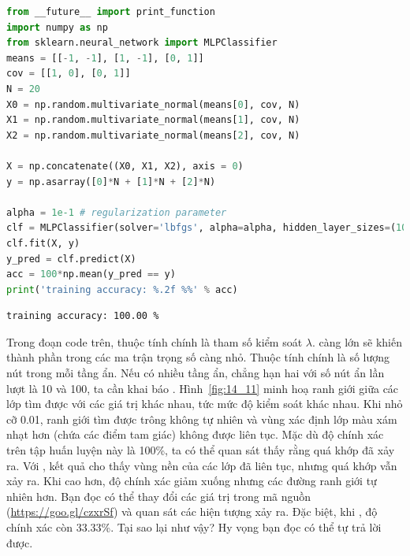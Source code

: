 \begin{lstlisting}[language=Python]
from __future__ import print_function 
import numpy as np 
from sklearn.neural_network import MLPClassifier
means = [[-1, -1], [1, -1], [0, 1]]
cov = [[1, 0], [0, 1]]
N = 20
X0 = np.random.multivariate_normal(means[0], cov, N)
X1 = np.random.multivariate_normal(means[1], cov, N)
X2 = np.random.multivariate_normal(means[2], cov, N)

X = np.concatenate((X0, X1, X2), axis = 0)
y = np.asarray([0]*N + [1]*N + [2]*N)

alpha = 1e-1 # regularization parameter 
clf = MLPClassifier(solver='lbfgs', alpha=alpha, hidden_layer_sizes=(100))
clf.fit(X, y)
y_pred = clf.predict(X) 
acc = 100*np.mean(y_pred == y)
print('training accuracy: %.2f %%' % acc)
\end{lstlisting}
\kq
\begin{lstlisting}
training accuracy: 100.00 %
\end{lstlisting}

Trong đoạn code trên, thuộc tính  chính là tham số
kiểm soát $\lambda$.  càng lớn sẽ khiến thành phần trong các ma
trận trọng số càng nhỏ. Thuộc tính  chính là số
lượng nút trong mỗi tầng ẩn. Nếu có nhiều tầng ẩn, chẳng hạn
hai với số nút ẩn lần lượt là 10 và 100, ta cần khai báo
. Hình~\ref{fig:14_11} minh hoạ ranh
giới giữa các lớp tìm được với các giá trị  khác nhau, tức
mức độ kiểm soát khác nhau. Khi  nhỏ cỡ 0.01, ranh
giới tìm được trông không tự nhiên và vùng xác định lớp màu xám nhạt hơn (chứa các điểm tam giác) không được
liên tục. Mặc dù độ chính xác trên tập huấn luyện này là 100\%, ta có thể quan
sát thấy rằng quá khớp đã xảy ra. Với , kết quả cho
thấy vùng nền của các lớp đã liên tục, nhưng quá khớp vẫn xảy ra.
Khi  cao hơn, độ chính xác giảm xuống nhưng các đường
ranh giới tự nhiên hơn. Bạn đọc có thể thay đổi các giá trị 
trong mã nguồn (\url{https://goo.gl/czxrSf}) và quan sát các hiện tượng xảy
ra. Đặc biệt, khi , độ chính xác còn 33.33\%. Tại sao
lại như vậy? Hy vọng bạn đọc có thể tự trả lời được. 

